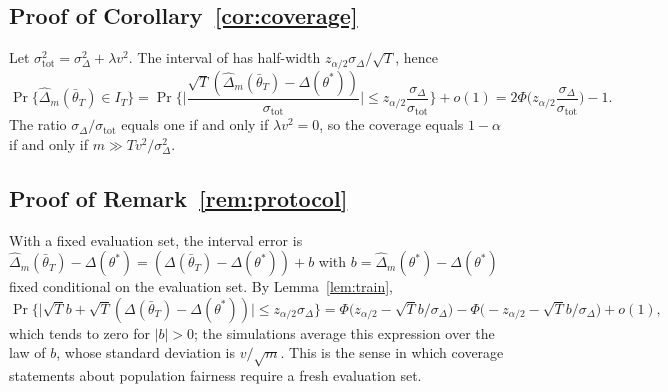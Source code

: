 \documentclass[11pt]{article}
\newcommand{\dhat}{\hat\Delta}
\newcommand{\tbar}{\bar\theta}
\begin{document}
\subsection{Proof of Corollary~\ref{cor:coverage}}
Let $\sigma_{\mathrm{tot}}^2=\sigma^2_\Delta+\lambda v^2$.  The interval of \citet{roy2026uq} has
half-width $z_{\alpha/2}\sigma_\Delta/\sqrt T$, hence
\[
\Pr\{\dhat_m(\tbar_T)\in I_T\}
=\Pr\Big\{\Big|\frac{\sqrt T(\dhat_m(\tbar_T)-\Delta(\theta^*))}{\sigma_{\mathrm{tot}}}\Big|
\le z_{\alpha/2}\frac{\sigma_\Delta}{\sigma_{\mathrm{tot}}}\Big\}+o(1)
=2\Phi\Big(z_{\alpha/2}\frac{\sigma_\Delta}{\sigma_{\mathrm{tot}}}\Big)-1 .
\]
The ratio $\sigma_\Delta/\sigma_{\mathrm{tot}}$ equals one if and only if $\lambda v^2=0$, so the
coverage equals $1-\alpha$ if and only if $m\gg Tv^2/\sigma^2_\Delta$.

\subsection{Proof of Remark~\ref{rem:protocol}}
With a fixed evaluation set, the interval error is
$\dhat_m(\tbar_T)-\Delta(\theta^*)=(\Delta(\tbar_T)-\Delta(\theta^*))+b$ with
$b=\dhat_m(\theta^*)-\Delta(\theta^*)$ fixed conditional on the evaluation set.  By
Lemma~\ref{lem:train},
\[
\Pr\Big\{\big|\sqrt T b+\sqrt T(\Delta(\tbar_T)-\Delta(\theta^*))\big|\le z_{\alpha/2}\sigma_\Delta\Big\}
=\Phi\big(z_{\alpha/2}-\sqrt T b/\sigma_\Delta\big)-\Phi\big(-z_{\alpha/2}-\sqrt T b/\sigma_\Delta\big)+o(1),
\]
which tends to zero for $|b|>0$; the simulations average this expression over the law of $b$, whose
standard deviation is $v/\sqrt m$.  This is the sense in which coverage statements about population
fairness require a fresh evaluation set.
\end{document}
